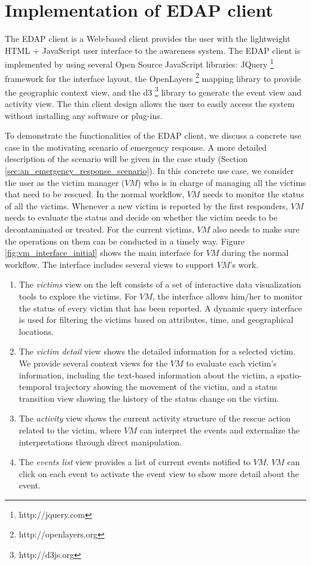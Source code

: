 \section{Implementation of EDAP client} %
\label{sec:implementation_of_edap_client}
The EDAP client is a Web-based client provides the user with the lightweight HTML + JavaScript user interface to the awareness system. The EDAP client is implemented by using several Open Source JavaScript libraries: JQuery \footnote{http://jquery.com} framework for the interface layout, the OpenLayers \footnote{http://openlayers.org} mapping library to provide the geographic context view, and the d3 \footnote{http://d3js.org} library to generate the event view and activity view. The thin client design allows the user to easily access the system without installing any software or plug-ins. 

To demonstrate the functionalities of the EDAP client, we discuss a concrete use case in the motivating scenario of emergency response. A more detailed description of the scenario will be given in the case study (Section \ref{sec:an_emergency_response_scenario}). In this concrete use case, we consider the user as the victim manager ($VM$) who is in charge of managing all the victims that need to be rescued. In the normal workflow, $VM$ needs to monitor the status of all the victims. Whenever a new victim is reported by the first responders, $VM$ needs to evaluate the status and decide on whether the victim needs to be decontaminated or treated. For the current victims, $VM$ also needs to make sure the operations on them can be conducted in a timely way. Figure \ref{fig:vm_interface_initial} shows the main interface for $VM$ during the normal workflow. The interface includes several views to support $VM$'s work. 

\begin{enumerate}
	\item The \emph{victims} view on the left consists of a set of interactive data visualization tools to explore the victims. For $VM$, the interface allows him/her to monitor the status of every victim that has been reported. A dynamic query interface is used for filtering the victims based on attributes, time, and geographical locations.
	\item The \emph{victim detail} view shows the detailed information for a selected victim. We provide several context views for the $VM$ to evaluate each victim's information, including the text-based information about the victim, a spatio-temporal trajectory showing the movement of the victim, and a status transition view showing the history of the status change on the victim.
	\item The \emph{activity} view shows the current activity structure of the rescue action related to the victim, where $VM$ can interpret the events and externalize the interpretations through direct manipulation.
	\item The \emph{events list} view provides a list of current events notified to $VM$. $VM$ can click on each event to activate the event view to show more detail about the event.
\end{enumerate}

